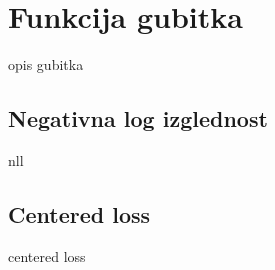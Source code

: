 \chapter{Funkcija gubitka}

opis gubitka

\section{Negativna log izglednost}

nll

\section{Centered loss}

centered loss